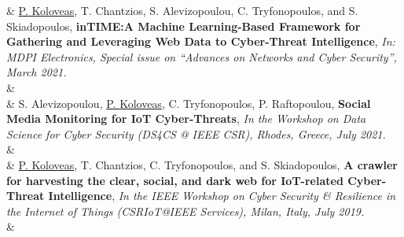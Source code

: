 
& \underline{P. Koloveas}, T. Chantzios, S. Alevizopoulou, C. Tryfonopoulos, and S. Skiadopoulos, \textbf{inTIME:\@ A Machine Learning-Based Framework for Gathering and Leveraging Web Data to Cyber-Threat Intelligence}, \textit{In: MDPI Electronics, Special issue on ``Advances on Networks and Cyber Security'', March 2021.} \\
& \\[-5pt]


& S. Alevizopoulou, \underline{P. Koloveas}, C. Tryfonopoulos, P. Raftopoulou, \textbf{Social Media Monitoring for IoT Cyber-Threats}, \textit{In the Workshop on Data Science for Cyber Security (DS4CS @ IEEE CSR), Rhodes, Greece, July 2021.}\\
& \\[-5pt]


& \underline{P. Koloveas}, T. Chantzios, C. Tryfonopoulos, and S. Skiadopoulos, \textbf{A crawler for harvesting the clear, social, and dark web for IoT-related Cyber-Threat Intelligence}, \textit{In the IEEE Workshop on Cyber Security \& Resilience in the Internet of Things (CSRIoT@IEEE Services), Milan, Italy, July 2019.}\\
& \\[-5pt]

